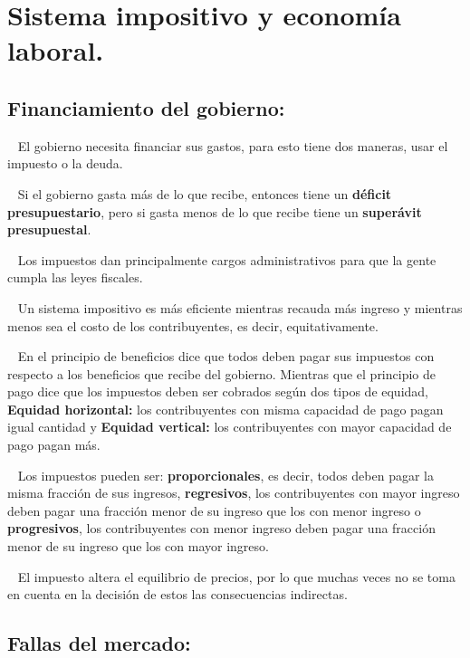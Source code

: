 \documentclass[
  letterpaper,
  DIV=11,
  numbers=noendperiod]{scrreport}
\begin{document}

\hypertarget{sistema-impositivo-y-economuxeda-laboral.}{%
\chapter{Sistema impositivo y economía
laboral.}\label{sistema-impositivo-y-economuxeda-laboral.}}

\hypertarget{financiamiento-del-gobierno}{%
\section{Financiamiento del
gobierno:}\label{financiamiento-del-gobierno}}

~ El gobierno necesita financiar sus gastos, para esto tiene dos
maneras, usar el impuesto o la deuda.

~ Si el gobierno gasta más de lo que recibe, entonces tiene un
\textbf{déficit presupuestario}, pero si gasta menos de lo que recibe
tiene un \textbf{superávit presupuestal}.

~ Los impuestos dan principalmente cargos administrativos para que la
gente cumpla las leyes fiscales.

~ Un sistema impositivo es más eficiente mientras recauda más ingreso y
mientras menos sea el costo de los contribuyentes, es decir,
equitativamente.

~ En el principio de beneficios dice que todos deben pagar sus impuestos
con respecto a los beneficios que recibe del gobierno. Mientras que el
principio de pago dice que los impuestos deben ser cobrados según dos
tipos de equidad, \textbf{Equidad horizontal:} los contribuyentes con
misma capacidad de pago pagan igual cantidad y \textbf{Equidad
vertical:} los contribuyentes con mayor capacidad de pago pagan más.

~ Los impuestos pueden ser: \textbf{proporcionales}, es decir, todos
deben pagar la misma fracción de sus ingresos, \textbf{regresivos}, los
contribuyentes con mayor ingreso deben pagar una fracción menor de su
ingreso que los con menor ingreso o \textbf{progresivos}, los
contribuyentes con menor ingreso deben pagar una fracción menor de su
ingreso que los con mayor ingreso.

~ El impuesto altera el equilibrio de precios, por lo que muchas veces
no se toma en cuenta en la decisión de estos las consecuencias
indirectas.

\hypertarget{fallas-del-mercado}{%
\section{Fallas del mercado:}\label{fallas-del-mercado}}
\end{document}

